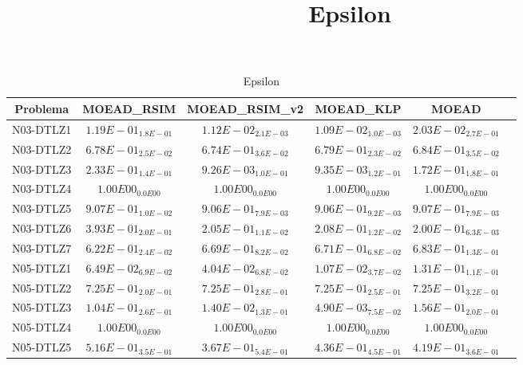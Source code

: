 \documentclass{article}
\title{Epsilon}
\author{}
\begin{document}
\maketitle
\begin{table*}[ht!]
\scriptsize
\caption{Epsilon}
\centering\begin{tabular}{|c||c||c||c||c||c|} \hline
Problema &MOEAD_RSIM &MOEAD_RSIM_v2 &MOEAD_KLP &MOEAD\\\hline
N03-DTLZ1 &$1.19E-01_{1.8E-01}$ &\cellcolor{gray25}$1.12E-02_{2.1E-03}$ &\cellcolor{gray95}$1.09E-02_{1.0E-03}$ &$2.03E-02_{2.7E-01}$\\ 
\hline
N03-DTLZ2 &\cellcolor{gray25}$6.78E-01_{2.5E-02}$ &\cellcolor{gray95}$6.74E-01_{3.6E-02}$ &$6.79E-01_{2.3E-02}$ &$6.84E-01_{3.5E-02}$\\ 
\hline
N03-DTLZ3 &$2.33E-01_{1.4E-01}$ &\cellcolor{gray95}$9.26E-03_{1.0E-01}$ &\cellcolor{gray25}$9.35E-03_{1.2E-01}$ &$1.72E-01_{1.8E-01}$\\ 
\hline
N03-DTLZ4 &\cellcolor{gray95}$1.00E00_{0.0E00}$ &\cellcolor{gray25}$1.00E00_{0.0E00}$ &$1.00E00_{0.0E00}$ &$1.00E00_{0.0E00}$\\ 
\hline
N03-DTLZ5 &$9.07E-01_{1.0E-02}$ &\cellcolor{gray95}$9.06E-01_{7.9E-03}$ &\cellcolor{gray25}$9.06E-01_{9.2E-03}$ &$9.07E-01_{7.9E-03}$\\ 
\hline
N03-DTLZ6 &$3.93E-01_{2.0E-01}$ &\cellcolor{gray25}$2.05E-01_{1.1E-02}$ &$2.08E-01_{1.2E-02}$ &\cellcolor{gray95}$2.00E-01_{6.3E-03}$\\ 
\hline
N03-DTLZ7 &\cellcolor{gray95}$6.22E-01_{2.4E-02}$ &\cellcolor{gray25}$6.69E-01_{8.2E-02}$ &$6.71E-01_{6.8E-02}$ &$6.83E-01_{1.3E-01}$\\ 
\hline
N05-DTLZ1 &$6.49E-02_{6.9E-02}$ &\cellcolor{gray25}$4.04E-02_{6.8E-02}$ &\cellcolor{gray95}$1.07E-02_{3.7E-02}$ &$1.31E-01_{1.1E-01}$\\ 
\hline
N05-DTLZ2 &\cellcolor{gray95}$7.25E-01_{2.0E-01}$ &$7.25E-01_{2.8E-01}$ &\cellcolor{gray25}$7.25E-01_{2.5E-01}$ &$7.25E-01_{3.2E-01}$\\ 
\hline
N05-DTLZ3 &$1.04E-01_{2.6E-01}$ &\cellcolor{gray25}$1.40E-02_{1.3E-01}$ &\cellcolor{gray95}$4.90E-03_{7.5E-02}$ &$1.56E-01_{2.0E-01}$\\ 
\hline
N05-DTLZ4 &\cellcolor{gray95}$1.00E00_{0.0E00}$ &\cellcolor{gray25}$1.00E00_{0.0E00}$ &$1.00E00_{0.0E00}$ &$1.00E00_{0.0E00}$\\ 
\hline
N05-DTLZ5 &$5.16E-01_{3.5E-01}$ &\cellcolor{gray95}$3.67E-01_{5.4E-01}$ &$4.36E-01_{4.5E-01}$ &\cellcolor{gray25}$4.19E-01_{3.6E-01}$\\ 

\end{tabular}
\end{table*}
\end{document}
